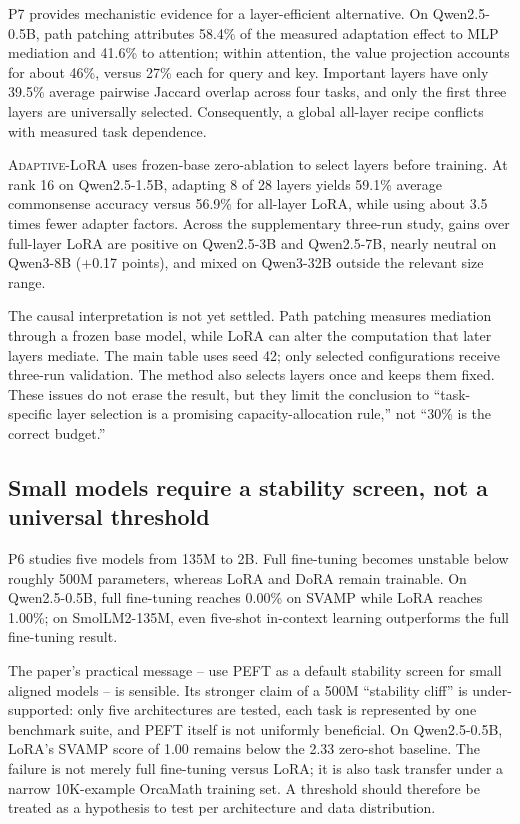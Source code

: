 \documentclass[11pt]{article}
\newcommand{\method}[1]{\textsc{#1}}
\begin{document}
P7 provides mechanistic evidence for a layer-efficient alternative. On Qwen2.5-0.5B, path patching attributes 58.4\% of the measured adaptation effect to MLP mediation and 41.6\% to attention; within attention, the value projection accounts for about 46\%, versus 27\% each for query and key. Important layers have only 39.5\% average pairwise Jaccard overlap across four tasks, and only the first three layers are universally selected. Consequently, a global all-layer recipe conflicts with measured task dependence.

\method{Adaptive-LoRA} uses frozen-base zero-ablation to select layers before training. At rank 16 on Qwen2.5-1.5B, adapting 8 of 28 layers yields 59.1\% average commonsense accuracy versus 56.9\% for all-layer LoRA, while using about 3.5 times fewer adapter factors. Across the supplementary three-run study, gains over full-layer LoRA are positive on Qwen2.5-3B and Qwen2.5-7B, nearly neutral on Qwen3-8B (+0.17 points), and mixed on Qwen3-32B outside the relevant size range.

The causal interpretation is not yet settled. Path patching measures mediation through a frozen base model, while LoRA can alter the computation that later layers mediate. The main table uses seed 42; only selected configurations receive three-run validation. The method also selects layers once and keeps them fixed. These issues do not erase the result, but they limit the conclusion to ``task-specific layer selection is a promising capacity-allocation rule,'' not ``30\% is the correct budget.''

\subsection{Small models require a stability screen, not a universal threshold}

P6 studies five models from 135M to 2B. Full fine-tuning becomes unstable below roughly 500M parameters, whereas LoRA and DoRA remain trainable. On Qwen2.5-0.5B, full fine-tuning reaches 0.00\% on SVAMP while LoRA reaches 1.00\%; on SmolLM2-135M, even five-shot in-context learning outperforms the full fine-tuning result.

The paper's practical message -- use PEFT as a default stability screen for small aligned models -- is sensible. Its stronger claim of a 500M ``stability cliff'' is under-supported: only five architectures are tested, each task is represented by one benchmark suite, and PEFT itself is not uniformly beneficial. On Qwen2.5-0.5B, LoRA's SVAMP score of 1.00 remains below the 2.33 zero-shot baseline. The failure is not merely full fine-tuning versus LoRA; it is also task transfer under a narrow 10K-example OrcaMath training set. A threshold should therefore be treated as a hypothesis to test per architecture and data distribution.
\end{document}
